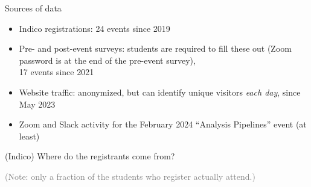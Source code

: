 \documentclass[aspectratio=169]{beamer}
\begin{document}
\begin{frame}{Sources of data}
\Large
\vspace{0.5 cm}
\begin{itemize}\setlength{\itemsep}{0.35 cm}
\item<1-> Indico registrations: 24 events since 2019
\item<2-> Pre- and post-event surveys: students are required to fill these out (Zoom password is at the end of the pre-event survey), \\ 17 events since 2021

\vspace{0.25 cm}

\item<4-> Website traffic: anonymized, but can identify unique visitors {\it each day}, since May 2023
\item<5-> Zoom and Slack activity for the February 2024 ``Analysis Pipelines'' event (at least)
\end{itemize}
\end{frame}

\begin{frame}{(Indico) Where do the registrants come from?}
\large
\vspace{0.5 cm}
\begin{center}

\vspace{0.35 cm}
\textcolor{gray}{(Note: only a fraction of the students who register actually attend.)}
\end{center}
\end{frame}
\end{document}

